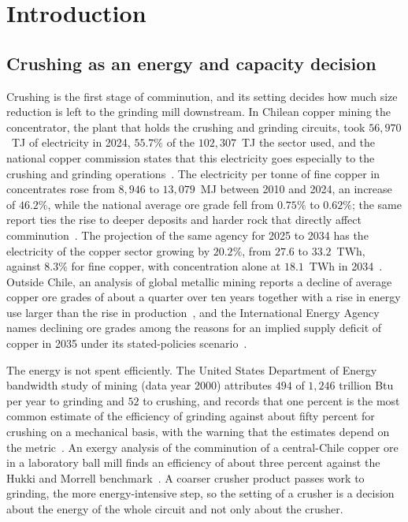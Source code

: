 \section{Introduction}\label{sec:intro}

\subsection{Crushing as an energy and capacity decision}\label{sec:intro-context}

Crushing is the first stage of comminution, and its setting decides how much size reduction is left to the grinding mill
downstream. In Chilean copper mining the concentrator, the plant that holds the crushing and grinding circuits, took
$56{,}970$~TJ of electricity in 2024, $55.7\%$ of the $102{,}307$~TJ the sector used, and the national copper commission
states that this electricity goes especially to the crushing and grinding operations~\cite{cochilco2025}. The electricity
per tonne of fine copper in concentrates rose from $8{,}946$ to $13{,}079$~MJ between 2010 and 2024, an increase of
$46.2\%$, while the national average ore grade fell from $0.75\%$ to $0.62\%$; the same report ties the rise to deeper
deposits and harder rock that directly affect comminution~\cite{cochilco2025}. The projection of the same agency for
2025 to 2034 has the electricity of the copper sector growing by $20.2\%$, from $27.6$ to $33.2$~TWh, against $8.3\%$ for
fine copper, with concentration alone at $18.1$~TWh in 2034~\cite{cochilco2026}. Outside Chile, an analysis of global
metallic mining reports a decline of average copper ore grades of about a quarter over ten years together with a rise in
energy use larger than the rise in production~\cite{calvo2016}, and the International Energy Agency names declining ore
grades among the reasons for an implied supply deficit of copper in 2035 under its stated-policies scenario~\cite{iea2025}.

The energy is not spent efficiently. The United States Department of Energy bandwidth study of mining (data year 2000)
attributes $494$ of $1{,}246$ trillion Btu per year to grinding and $52$ to crushing, and records that one percent is the
most common estimate of the efficiency of grinding against about fifty percent for crushing on a mechanical basis, with
the warning that the estimates depend on the metric~\cite{doe2007}. An exergy analysis of the comminution of a central-Chile
copper ore in a laboratory ball mill finds an efficiency of about three percent against the Hukki and Morrell
benchmark~\cite{jacob2017}. A coarser crusher product passes work to grinding, the more energy-intensive step, so the
setting of a crusher is a decision about the energy of the whole circuit and not only about the crusher.

